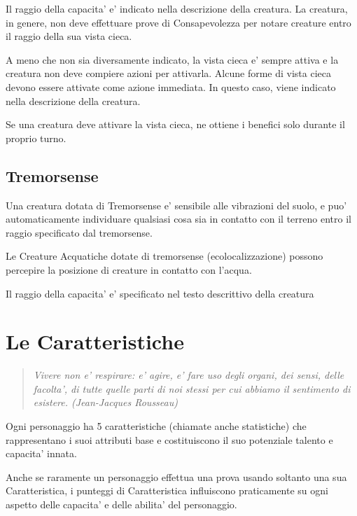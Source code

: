 \documentclass[a4paper,11pt,twoside,openany]{book}
\begin{document}
Il raggio della capacita' e' indicato nella descrizione della creatura. La creatura, in genere, non deve effettuare prove di Consapevolezza per notare creature entro il raggio della sua vista cieca.

A meno che non sia diversamente indicato, la vista cieca e' sempre attiva e la creatura non deve compiere azioni per attivarla. Alcune forme di vista cieca devono essere attivate come azione immediata. In questo caso, viene indicato nella descrizione della creatura.

Se una creatura deve attivare la vista cieca, ne ottiene i benefici solo durante il proprio turno.

\subsection{Tremorsense}
Una creatura dotata di Tremorsense e' sensibile alle vibrazioni del suolo, e puo' automaticamente individuare qualsiasi cosa sia in contatto con il terreno entro il raggio specificato dal tremorsense.

Le Creature Acquatiche dotate di tremorsense (ecolocalizzazione) possono percepire la posizione di creature in contatto con l’acqua.

Il raggio della capacita' e' specificato nel testo descrittivo della creatura

\pagebreak

\section{Le Caratteristiche}

\label{le-caratteristiche}

\begin{quote}\textit{Vivere non e' respirare: e' agire, e' fare uso degli organi, dei sensi, delle facolta', di tutte quelle parti di noi stessi per cui abbiamo il sentimento di esistere. (Jean-Jacques Rousseau)
}\end{quote}


Ogni personaggio ha 5 caratteristiche (chiamate anche statistiche) che rappresentano i suoi attributi base e costituiscono il suo potenziale talento e capacita' innata. 

Anche se raramente un personaggio effettua una prova usando soltanto una sua Caratteristica, i punteggi di Caratteristica influiscono praticamente su ogni aspetto delle capacita' e delle abilita' del personaggio.
\end{document}
